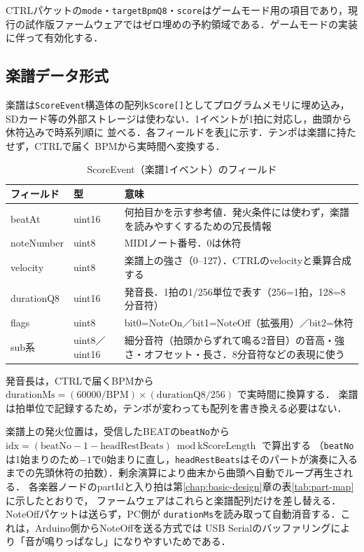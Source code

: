 \documentclass[lualatex,book,paper=a4paper,jafontsize=11.5pt,jafontscale=1.05]{jlreq}
\begin{document}
CTRLパケットの\texttt{mode}・\texttt{targetBpmQ8}・\texttt{score}はゲームモード用の項目であり，現行の試作版ファームウェアではゼロ埋めの予約領域である．ゲームモードの実装に伴って有効化する．

\subsection{楽譜データ形式}
楽譜は\texttt{ScoreEvent}構造体の配列\texttt{kScore[]}としてプログラムメモリに埋め込み，
SDカード等の外部ストレージは使わない．1イベントが1拍に対応し，曲頭から休符込みで時系列順に
並べる．各フィールドを表\ref{tab:score-event}に示す．テンポは楽譜に持たせず，CTRLで届く
BPMから実時間へ変換する．
\begin{table}[H]\centering
  \caption{ScoreEvent（楽譜1イベント）のフィールド}\label{tab:score-event}
  \small
  \begin{tabularx}{\linewidth}{>{\raggedright\arraybackslash}p{2.5cm} >{\raggedright\arraybackslash}p{2.3cm} X}
    \toprule
    フィールド & 型 & 意味 \\
    \midrule
    beatAt & uint16 & 何拍目かを示す参考値．発火条件には使わず，楽譜を読みやすくするための冗長情報 \\
    noteNumber & uint8 & MIDIノート番号．0は休符 \\
    velocity & uint8 & 楽譜上の強さ（0--127）．CTRLのvelocityと乗算合成する \\
    durationQ8 & uint16 & 発音長．1拍の1/256単位で表す（256=1拍，128=8分音符） \\
    flags & uint8 & bit0=NoteOn／bit1=NoteOff（拡張用）／bit2=休符 \\
    sub系 & uint8／uint16 & 細分音符（拍頭からずれて鳴る2音目）の音高・強さ・オフセット・長さ．8分音符などの表現に使う \\
    \bottomrule
  \end{tabularx}
\end{table}
発音長は，CTRLで届くBPMから
$\text{durationMs} = (60000 / \text{BPM}) \times (\text{durationQ8} / 256)$ で実時間に換算する．
楽譜は拍単位で記録するため，テンポが変わっても配列を書き換える必要はない．

楽譜上の発火位置は，受信したBEATの\texttt{beatNo}から
$\text{idx} = (\text{beatNo} - 1 - \text{headRestBeats}) \bmod \text{kScoreLength}$ で算出する
（\texttt{beatNo}は1始まりのため$-1$で0始まりに直し，\texttt{headRestBeats}はそのパートが演奏に入るまでの先頭休符の拍数）．剰余演算により曲末から曲頭へ自動でループ再生される．
各楽器ノードのpartIdと入り拍は第\ref{chap:basic-design}章の表\ref{tab:part-map}に示したとおりで，
ファームウェアはこれらと楽譜配列だけを差し替える．NoteOffパケットは送らず，PC側が
\texttt{durationMs}を読み取って自動消音する．これは，Arduino側からNoteOffを送る方式では
USB Serialのバッファリングにより「音が鳴りっぱなし」になりやすいためである．
\end{document}
